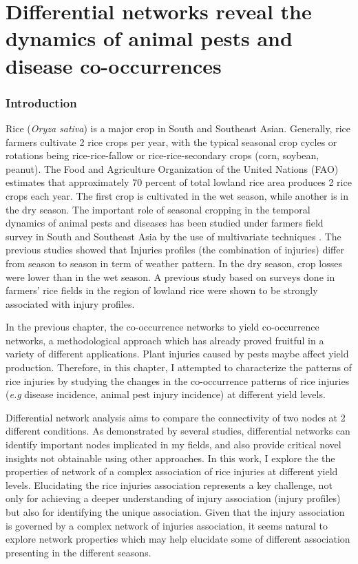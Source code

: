 \chapter{Differential networks reveal the dynamics of animal pests and disease co-occurrences}

\subsection{Introduction}
Rice (\textit{Oryza sativa}) is a major crop in South and Southeast Asian. Generally, rice farmers cultivate 2 rice crops per year, with the typical seasonal crop cycles or rotations being rice-rice-fallow or rice-rice-secondary crops (corn, soybean, peanut). The Food and Agriculture Organization of the United Nations (FAO) estimates that approximately 70 percent of total lowland rice area produces 2 rice crops each year. The first crop is cultivated in the wet season, while another is in the dry season. The important role of seasonal cropping in the temporal dynamics of animal pests and diseases has been studied under farmers field survey in South and Southeast Asia by the use of multivariate techniques \citet{Savary_2000_Characterization, Willocquet_2008_Simulating}. The previous studies showed that Injuries profiles (the combination of injuries) differ from season to season in term of weather pattern. In the dry season, crop losses were lower than in the wet season. A previous study based on surveys done in farmers’ rice fields in the region of lowland rice were shown to be strongly associated with injury profiles.

In the previous chapter, the co-occurrence networks to yield co-occurrence networks, a methodological approach which has already proved fruitful in a variety of different applications.  Plant injuries caused by pests maybe affect yield production. Therefore, in this chapter, I attempted to characterize the patterns of rice injuries by studying the changes in the co-occurrence patterns of rice injuries (\textit{e.g} disease incidence, animal pest injury incidence) at different yield levels.

Differential network analysis aims to compare the connectivity of two nodes at 2 different conditions. As demonstrated by several studies, differential networks can identify important nodes implicated in my fields, and also provide critical novel insights not obtainable using other approaches. In this work, I explore the the properties of network of a complex association of rice injuries at different yield levels. Elucidating the rice injuries association represents a key challenge, not only for achieving a deeper understanding of injury association (injury profiles) but also for identifying the unique association. Given that the injury association is governed by a complex network of injuries association, it seems natural to explore network properties which may help elucidate some of different association presenting in the different seasons.

